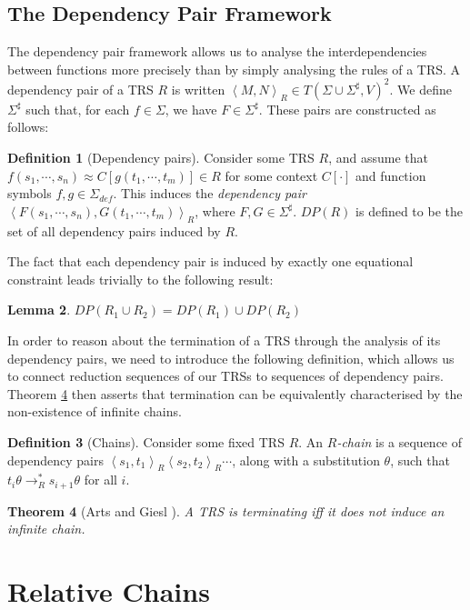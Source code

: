 \documentclass{article}
\newtheorem{theorem}{Theorem}%
\newtheorem{lemma}[theorem]{Lemma}
\theoremstyle{definition}
\newtheorem{definition}[theorem]{Definition}
\newcommand{\dpair}[2]{\left\langle #1, #2 \right\rangle}
\begin{document}
\subsection{The Dependency Pair Framework}

The dependency pair framework \cite{arts2000dependency} allows us to analyse the interdependencies between functions more precisely than by simply analysing the rules of a TRS. A dependency pair of a TRS $R$ is written $\dpair{M}{N}_R \in T(\Sigma \cup \Sigma^\sharp, V)^2$. We define $\Sigma^\sharp$ such that, for each $f \in \Sigma$, we have $F \in \Sigma^\sharp$. These pairs are constructed as follows:
\begin{definition}[Dependency pairs]
    Consider some TRS $R$, and assume that $f(s_1, \cdots, s_n) \approx C[g(t_1, \cdots, t_m)] \in R$ for some context $C[\cdot]$ and function symbols $f, g \in \Sigma_{def}$. This induces the \emph{dependency pair} $\dpair{F (s_1, \cdots, s_n)}{G(t_1, \cdots, t_m)}_R $, where $F, G \in \Sigma^\sharp$. $DP(R)$ is defined to be the set of all dependency pairs induced by $R$.
\end{definition}
The fact that each dependency pair is induced by exactly one equational constraint leads trivially to the following result:
\begin{lemma} \label{thm:dep_pair_mod}
    $DP(R_1 \cup R_2) = DP(R_1) \cup DP(R_2)$
\end{lemma}
In order to reason about the termination of a TRS through the analysis of its dependency pairs, we need to introduce the following definition, which allows us to connect reduction sequences of our TRSs to sequences of dependency pairs. Theorem \ref{thm:no_infinite_chains} then asserts that termination can be equivalently characterised by the non-existence of infinite chains.
\begin{definition}[Chains]
    Consider some fixed TRS $R$. An \emph{$R$-chain} is a sequence of dependency pairs $\dpair{s_1}{t_1}_R \dpair{s_2}{t_2}_R \cdots$, along with a substitution $\theta$, such that $t_i \theta \rightarrow_R^* s_{i+1}\theta$ for all $i$.
\end{definition}
\begin{theorem}[Arts and Giesl \cite{arts2000dependency}]\label{thm:no_infinite_chains}
    A TRS is terminating iff it does not induce an infinite chain.
\end{theorem} 

\section{Relative Chains}
\end{document}
